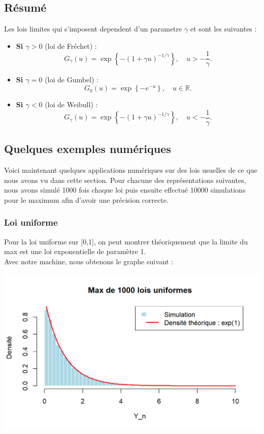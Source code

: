 \documentclass{article}
\begin{document}
\subsection{Résumé}
Les lois limites qui s'imposent dependent d'un parametre $\gamma$ et sont les suivantes :
\\
\begin{itemize}
    \item \textbf{Si \(\gamma>0\)} (loi de Fréchet) :
    \[
    G_\gamma(u)=\exp\left\{-\left(1+\gamma u\right)^{-1/\gamma}\right\}, \quad u > -\frac{1}{\gamma}.
    \]
    
    \item \textbf{Si \(\gamma=0\)} (loi de Gumbel) :
    \[
    G_0(u)=\exp\left\{-e^{-u}\right\}, \quad u\in\mathbb{R}.
    \]
    
    \item \textbf{Si \(\gamma<0\)} (loi de Weibull) :
    \[
    G_\gamma(u)=\exp\left\{-\left(1+\gamma u\right)^{-1/\gamma}\right\}, \quad u < -\frac{1}{\gamma}.
    \]
\end{itemize}

\subsection{Quelques exemples numériques}

\noindent Voici maintenant quelques applications numériques sur des lois usuelles de ce que nous avons vu dans cette section. Pour chacune des représentations suivantes, nous avons simulé 1000 fois chaque loi puis ensuite effectué 10000 simulations pour le maximum afin d'avoir une précision correcte.

\subsubsection{Loi uniforme}

\noindent Pour la loi uniforme sur [0,1], on peut montrer théoriquement que la limite du max est une loi exponentielle de paramètre 1. \\
\noindent Avec notre machine, nous obtenons le graphe suivant :

\begin{center}
	\includegraphics[scale=0.8]{./Codes_R/Max_Uniforme.png} 
\end{center}
\end{document}
